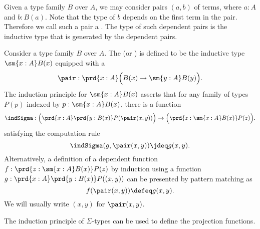 
Given a type family $B$ over $A$, we may consider pairs $(a,b)$ of terms, where $a:A$ and $b:B(a)$. Note that the type of $b$ depends on the first term in the pair. Therefore we call such a pair a . The type of such dependent pairs is the inductive type that is generated by the dependent pairs.

\begin{defn}
  Consider a type family $B$ over $A$.
  The  (or ) is defined to be the inductive type $\sm{x:A}B(x)$ equipped with a 
  \begin{equation*}
    \pair :\prd{x:A} \Big(B(x)\to \sm{y:A}B(y)\Big).
  \end{equation*}
  The induction principle for $\sm{x:A}B(x)$ asserts that for any family of types $P(p)$ indexed by $p:\sm{x:A}B(x)$, there is a function
  \begin{equation*}
    \indSigma:\Big(\prd{x:A}\prd{y:B(x)}P(\pair(x,y))\Big)\to\Big(\prd{z:\sm{x:A}B(x)}P(z)\Big).
  \end{equation*}
  satisfying the computation rule
  \begin{equation*}
    \indSigma(g,\pair(x,y))\jdeq g(x,y).
  \end{equation*}
  Alternatively, a definition of a dependent function $f:\prd{z:\sm{x:A}B(x)}P(z)$ by induction using a function $g:\prd{x:A}\prd{y:B(x)}P((x,y))$ can be presented by pattern matching as
  \begin{equation*}
    f(\pair(x,y))\defeq g(x,y).
  \end{equation*}
  We will usually write $(x,y)$ for $\pair(x,y)$.
\end{defn}

The induction principle of $\Sigma$-types can be used to define the projection functions.

